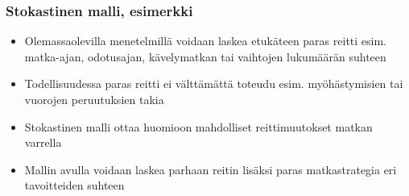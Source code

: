 \documentclass{beamer}
\begin{document}
\begin{frame}
  \frametitle{Stokastinen malli, esimerkki} 
  \begin{itemize}
   \item 
    Olemassaolevilla menetelmillä voidaan laskea etukäteen paras reitti esim. matka-ajan, odotusajan, kävelymatkan tai vaihtojen lukumäärän suhteen 
    \item
    Todellisuudessa paras reitti ei välttämättä toteudu esim. myöhästymisien tai vuorojen peruutuksien takia
    \item
    Stokastinen malli ottaa huomioon mahdolliset reittimuutokset matkan varrella
    \item
    Mallin avulla voidaan laskea parhaan reitin lisäksi paras matkastrategia eri tavoitteiden suhteen
   \end{itemize}
     \begin{center}
      \end{center}
\end{frame} 

    
\end{document}
